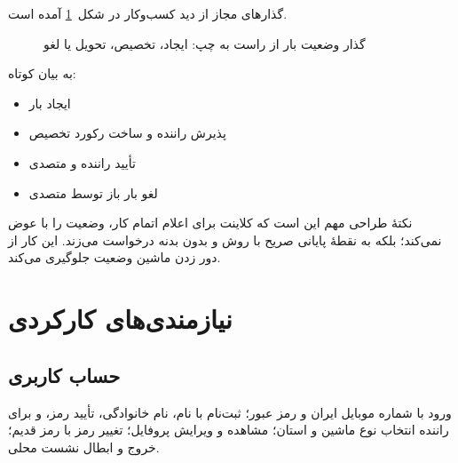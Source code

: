گذارهای مجاز از دید کسب‌وکار در شکل~\ref{fig:status-flow} آمده است.

\begin{figure}[ht]
\centering
{}
\caption{گذار وضعیت بار از راست به چپ: ایجاد، تخصیص، تحویل یا لغو}
\label{fig:status-flow}
\end{figure}

به بیان کوتاه:

\begin{itemize}
  \item ایجاد بار \faarr{} 
  \item پذیرش راننده \faarr{}  و ساخت رکورد تخصیص
  \item تأیید راننده و متصدی \faarr{} 
  \item لغو بار باز توسط متصدی \faarr{} 
\end{itemize}

نکتهٔ طراحی مهم این است که کلاینت برای اعلام اتمام کار، وضعیت را با  عوض نمی‌کند؛ بلکه به نقطهٔ پایانی صریح  با روش  و بدون بدنه درخواست می‌زند. این کار از دور زدن ماشین وضعیت جلوگیری می‌کند.

\section{نیازمندی‌های کارکردی}

\subsection{حساب کاربری}
ورود با شماره موبایل ایران و رمز عبور؛ ثبت‌نام با نام، نام خانوادگی، تأیید رمز، و برای راننده انتخاب نوع ماشین و استان؛ مشاهده و ویرایش پروفایل؛ تغییر رمز با رمز قدیم؛ خروج و ابطال نشست محلی.

